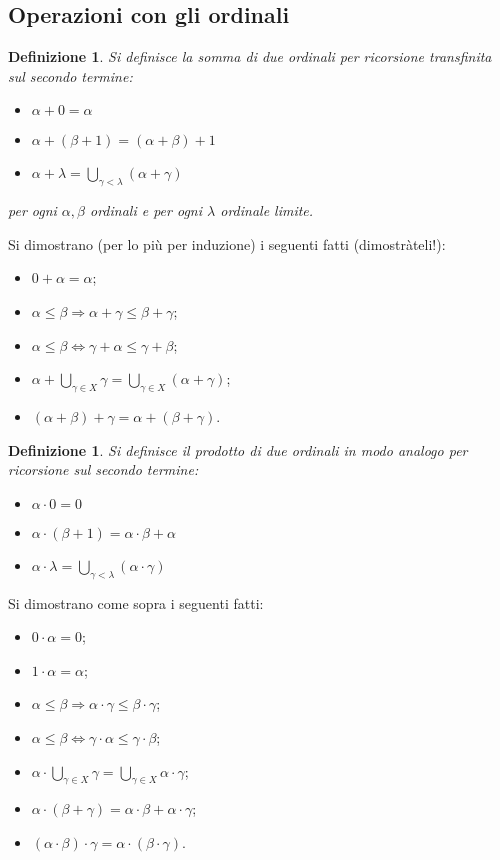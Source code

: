 \documentclass[a4paper,10pt,oneside]{article}
\theoremstyle{plain}
\newtheorem{mydef}[mytheorem]{Definizione}
\theoremstyle{definition}
\theoremstyle{remark}
\begin{document}
\subsection{Operazioni con gli ordinali}
\begin{mydef} Si definisce la somma di due ordinali per ricorsione transfinita sul secondo termine:
\begin{itemize}
   \item $\alpha + 0 = \alpha$
   \item $\alpha + (\beta+1)=(\alpha+\beta)+1$
   \item $\alpha + \lambda= \bigcup_{\gamma<\lambda}(\alpha+\gamma)$  
\end{itemize}
per ogni $\alpha, \beta$ ordinali e per ogni $\lambda$ ordinale limite.
\end{mydef}

Si dimostrano (per lo più per induzione) i seguenti fatti (dimostràteli!):
\begin{itemize}
 \item $0+\alpha=\alpha$;
 \item $\alpha \le \beta \Rightarrow \alpha+\gamma \le \beta + \gamma$;
 \item $\alpha \le \beta \Leftrightarrow \gamma+\alpha\le \gamma + \beta$;
 \item $\alpha + \bigcup_{\gamma \in X}\gamma = \bigcup_{\gamma \in X} (\alpha+\gamma)$;
 \item $(\alpha + \beta)+\gamma= \alpha + (\beta+\gamma)$. \qquad \qquad
\end{itemize}

\begin{mydef} Si definisce il prodotto di due ordinali in modo analogo per ricorsione sul secondo termine:
\begin{itemize}
   \item $\alpha \cdot 0 = 0$
   \item $\alpha \cdot (\beta+1) =\alpha\cdot\beta+\alpha$
   \item $\alpha \cdot \lambda= \bigcup_{\gamma<\lambda}(\alpha\cdot\gamma)$  
\end{itemize}
\end{mydef}

Si dimostrano come sopra i seguenti fatti:
\begin{itemize}
 \item $0\cdot\alpha=0$;
 \item $1\cdot \alpha =\alpha$;
 \item $\alpha \le \beta \Rightarrow \alpha\cdot\gamma \le \beta \cdot \gamma$;
 \item $\alpha \le \beta \Leftrightarrow \gamma\cdot\alpha\le \gamma \cdot \beta$;
 \item $\alpha \cdot \bigcup_{\gamma \in X}\gamma = \bigcup_{\gamma \in X} \alpha\cdot\gamma$;
 \item $\alpha\cdot(\beta+\gamma)=\alpha\cdot\beta+\alpha\cdot\gamma$;
 \item $(\alpha \cdot \beta)\cdot\gamma= \alpha \cdot (\beta\cdot\gamma)$. 
\end{itemize}
\end{document}
